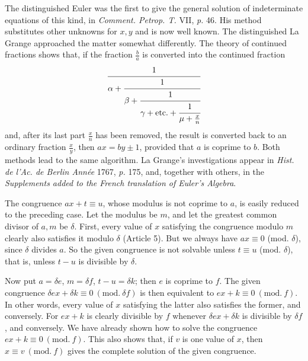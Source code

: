 
The distinguished Euler was the first to give the general solution of indeterminate equations of this kind, in \emph{Comment. Petrop. T.} VII, \emph{p.} 46. His method substitutes other unknowns for $x, y$ and is now well known. The distinguished La Grange approached the matter somewhat differently. The theory of continued fractions shows that, if the fraction $\frac{b}{a}$ is converted into the continued fraction
\[
\cfrac{1}{\alpha + \cfrac{1}{\beta + \cfrac{1}{\gamma + \text{etc.} + \cfrac{1}{\mu + \frac{x}{n}}}}}
\]
and, after its last part $\frac{x}{n}$ has been removed, the result is converted back to an ordinary fraction $\frac{x}{y}$, then $ax=by\pm1$, provided that $a$ is coprime to $b$. Both methods lead to the same algorithm. La Grange's investigations appear in \emph{Hist. de l'Ac. de Berlin Année} 1767, \emph{p.} 175, and, together with others, in the \emph{Supplements added to the French translation of Euler's Algebra}.


The congruence $ax+t \equiv u$, whose modulus is not coprime to $a$, is easily reduced to the preceding case. Let the modulus be $m$, and let the greatest common divisor of $a, m$ be $\delta$. First, every value of $x$ satisfying the congruence modulo $m$ clearly also satisfies it modulo $\delta$ (Article 5). But we always have $ax \equiv 0$ (mod. $\delta$), since $\delta$ divides $a$. So the given congruence is not solvable unless $t \equiv u$ (mod. $\delta$), that is, unless $t-u$ is divisible by $\delta$.

Now put $a = \delta e$, $m = \delta f$, $t - u = \delta k$; then $e$ is coprime to $f$. The given congruence $\delta e x + \delta k \equiv 0 \ (\mathrm{mod.}\ \delta f)$ is then equivalent to $ex + k \equiv 0 \ (\mathrm{mod.}\ f)$. In other words, every value of $x$ satisfying the latter also satisfies the former, and conversely. For $ex+k$ is clearly divisible by $f$ whenever $\delta e x + \delta k$ is divisible by $\delta f$, and conversely. We have already shown how to solve the congruence $ex+k\equiv 0\ (\mathrm{mod.}\ f)$. This also shows that, if $v$ is one value of $x$, then $x \equiv v \ (\mathrm{mod.}\ f)$ gives the complete solution of the given congruence.
